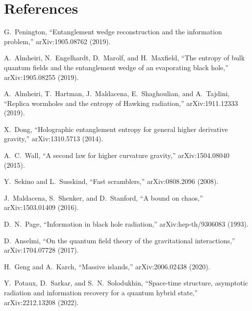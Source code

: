 \documentclass[11pt,a4paper]{article}
\theoremstyle{plain}
\theoremstyle{definition}
\begin{document}
\section*{References}
\begin{enumerate}[label={[\arabic*]}]
\item\label{ref:Penington2019} G.~Penington, ``Entanglement wedge
  reconstruction and the information problem,'' arXiv:1905.08762 (2019).

\item\label{ref:AEMM2019} A.~Almheiri, N.~Engelhardt, D.~Marolf, and
  H.~Maxfield, ``The entropy of bulk quantum fields and the entanglement
  wedge of an evaporating black hole,'' arXiv:1905.08255 (2019).

\item\label{ref:AHMST2019} A.~Almheiri, T.~Hartman, J.~Maldacena,
  E.~Shaghoulian, and A.~Tajdini, ``Replica wormholes and the entropy
  of Hawking radiation,'' arXiv:1911.12333 (2019).

\item\label{ref:Dong2014} X.~Dong, ``Holographic entanglement entropy
  for general higher derivative gravity,'' arXiv:1310.5713 (2014).

\item\label{ref:Wall2015} A.~C.~Wall, ``A second law for higher
  curvature gravity,'' arXiv:1504.08040 (2015).

\item\label{ref:SekinoSusskind} Y.~Sekino and L.~Susskind, ``Fast
  scramblers,'' arXiv:0808.2096 (2008).

\item\label{ref:MSS} J.~Maldacena, S.~Shenker, and D.~Stanford,
  ``A bound on chaos,'' arXiv:1503.01409 (2016).

\item\label{ref:Page1993} D.~N.~Page, ``Information in black hole
  radiation,'' arXiv:hep-th/9306083 (1993).

\item\label{ref:Anselmi2017} D.~Anselmi, ``On the quantum field theory
  of the gravitational interactions,'' arXiv:1704.07728 (2017).

\item\label{ref:GengKarch} H.~Geng and A.~Karch, ``Massive islands,''
  arXiv:2006.02438 (2020).

\item\label{ref:Solodukhin2022} Y.~Potaux, D.~Sarkar, and
  S.~N.~Solodukhin, ``Space-time structure, asymptotic radiation and
  information recovery for a quantum hybrid state,'' arXiv:2212.13208
  (2022).


\end{enumerate}
\end{document}
